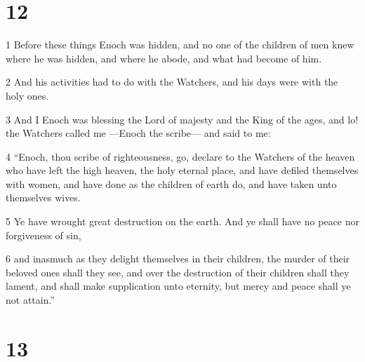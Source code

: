 \chapter{12}

\par 1 Before these things Enoch was hidden, and no one of the children of men knew where he was hidden, and where he abode, and what had become of him.
\par 2 And his activities had to do with the Watchers, and his days were with the holy ones.
\par 3 And I Enoch was blessing the Lord of majesty and the King of the ages, and lo! the Watchers called me —Enoch the scribe— and said to me:
\par 4 “Enoch, thou scribe of righteousness, go, declare to the Watchers of the heaven who have left the high heaven, the holy eternal place, and have defiled themselves with women, and have done as the children of earth do, and have taken unto themselves wives.
\par 5 Ye have wrought great destruction on the earth. And ye shall have no peace nor forgiveness of sin,
\par 6 and inasmuch as they delight themselves in their children, the murder of their beloved ones shall they see, and over the destruction of their children shall they lament, and shall make supplication unto eternity, but mercy and peace shall ye not attain.”

\chapter{13}


